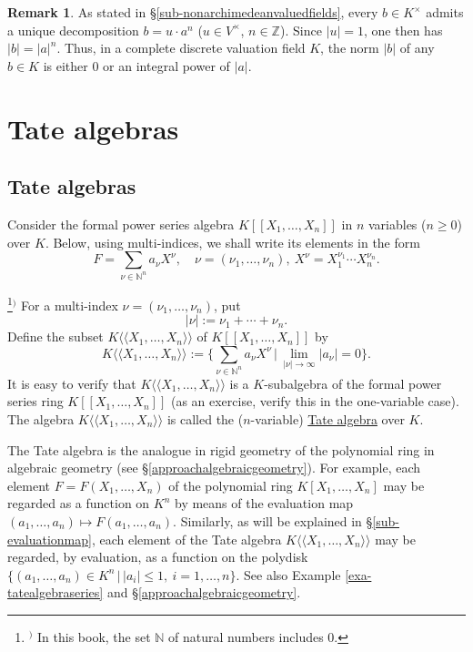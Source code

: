 \documentclass[a4paper,12pt, dvipdfmx]{jsbook}
\def\N{\mathbb{N}}
\def\Z{\mathbb{Z}}
\def\dl{\langle\!\langle}
\def\dr{\rangle\!\rangle}
\newcommand{\abs}[1]{\lvert#1\rvert}
\theoremstyle{plain}
\theoremstyle{definition}
\newtheorem{rem}[thm]{\bfseries Remark}
\newcounter{chushaku}
\def\chu#1{\addtocounter{chushaku}{1}\footnote[\value{chushaku}]{${}^)$ #1}${}^)$}
\begin{document}
\begin{rem}\label{rem-valuegroupdiscrete}{\rm 
As stated in \S\ref{sub-nonarchimedeanvaluedfields}, every $b\in K^{\times}$ admits a unique decomposition $b=u\cdot a^n$ ($u\in V^{\times}$, $n\in\Z$). Since $\abs{u}=1$, one then has $\abs{b}=\abs{a}^n$. Thus, in a complete discrete valuation field $K$, the norm $\abs{b}$ of any $b\in K$ is either $0$ or an integral power of $\abs{a}$.}
\end{rem}

\section{Tate algebras}\label{sec-tatealgebras}
\subsection{Tate algebras}\label{sub-tatealgebradefinition}
Consider the formal power series algebra $K[\![X_1,\ldots,X_n]\!]$ in $n$ variables ($n\geq 0$) over $K$.
Below, using multi-indices, we shall write its elements in the form
$$
F=\sum_{\nu\in\N^n}a_{\nu}X^{\nu},\quad\nu=(\nu_1,\ldots,\nu_n),\ X^{\nu}=X^{\nu_1}_1\cdots X^{\nu_n}_n.
$$
\chu{In this book, the set $\N$ of natural numbers includes $0$.}
For a multi-index $\nu=(\nu_1,\ldots,\nu_n)$, put
$$
\abs{\nu}:=\nu_1+\cdots+\nu_n.
$$
Define the subset $K\dl X_1,\ldots,X_n\dr$ of $K[\![X_1,\ldots,X_n]\!]$ by
$$
K\dl X_1,\ldots,X_n\dr:=\Bigg\{\sum_{\nu\in\N^n}a_{\nu}X^{\nu}\,\Bigg|\,
\lim_{\abs{\nu}\rightarrow\infty}\abs{a_{\nu}}=0
\Bigg\}.
$$
It is easy to verify that $K\dl X_1,\ldots,X_n\dr$ is a $K$-subalgebra of the formal power series ring $K[\![X_1,\ldots,X_n]\!]$ (as an exercise, verify this in the one-variable case).
The algebra $K\dl X_1,\ldots,X_n\dr$ is called the ($n$-variable) \underline{Tate algebra} over $K$.

The Tate algebra is the analogue in rigid geometry of the polynomial ring in algebraic geometry (see \S\ref{approachalgebraicgeometry}).
For example, each element $F=F(X_1,\ldots,X_n)$ of the polynomial ring $K[X_1,\ldots,X_n]$ may be regarded as a function on $K^n$ by means of the evaluation map $(a_1,\ldots,a_n)\mapsto F(a_1,\ldots,a_n)$. Similarly, as will be explained in \S\ref{sub-evaluationmap}, each element of the Tate algebra $K\dl X_1,\ldots,X_n\dr$ may be regarded, by evaluation, as a function on the polydisk $\{(a_1,\ldots,a_n)\in K^n\,|\,\abs{a_i}\leq 1,\ i=1,\ldots,n\}$. See also Example \ref{exa-tatealgebraseries} and \S\ref{approachalgebraicgeometry}.
\end{document}
